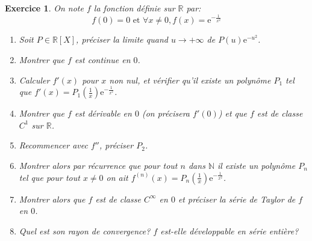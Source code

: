 \documentclass[17pt,a4paper,landscape]{article}
\newcommand{\R}{\mathbb{R}}
\newcommand{\N}{\mathbb{N}}
\newcommand{\E}{\mathrm{e}}
\theoremstyle{break}
\theoremstyle{break}
\newtheorem{Exo}{Exercice}
\begin{document}
\begin{Exo}
	
	
	On note $f$ la fonction définie sur $\R$ par:
	$$f(0)=0\text{ et }\forall x\neq 0,f(x)=\E^{-\frac{1}{x^2}}$$
	\begin{enumerate}
		\item Soit $P\in \R[X]$, préciser la limite quand $u\to +\infty$ de $P(u)\E^{-u^2}$.
		\item
		Montrer que $f$ est continue en $0$.
		\item
		Calculer $f'(x)$ pour  $x$ non nul, et vérifier qu'il existe un polynôme $P_1$ tel que $f'(x)=P_1\left(\frac{1}{x}\right)\E^{-\frac{1}{x^2}}$.
		\item
		Montrer que $f$ est dérivable en $0$ (on précisera $f'(0)$) et que $f$ est de classe $C^1$ sur $\R$.
		\item
		Recommencer avec $f''$, préciser $P_2$.
		\item
		Montrer alors par récurrence que pour tout $n$ dans $\N$ il existe un polynôme $P_n$ tel que pour tout $x\neq 0$ on ait $f^{(n)}(x)=P_n\left(\frac{1}{x}\right)\E^{-\frac{1}{x^2}}$.
		\item
		Montrer alors que $f$ est de classe $C^{\infty}$ en $0$ et préciser la série de Taylor de $f$ en $0$.
		\item
		Quel est son rayon de convergence? $f$ est-elle développable en série entière?
	\end{enumerate}
\end{Exo}
	
	
	
	
%		
	
\end{document}

